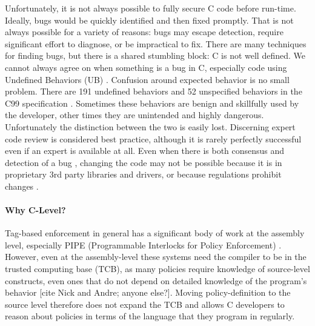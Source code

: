 \documentclass{llncs}
\begin{document}
  Unfortunately, it is not always possible to fully secure C code before run-time.
  Ideally, bugs would be quickly identified and then fixed promptly. 
  That is not always possible for a variety of reasons: bugs may escape detection, 
  require significant effort to diagnose, or be impractical to fix. 
  There are many techniques for finding bugs, but there is a shared stumbling block: C is not 
  well defined. We cannot always agree on when something is a bug in C, especially code using
   Undefined Behaviors (UB) \cite{defactoC}. Confusion around expected behavior is no small problem. 
  There are 191 undefined behaviors and 52 unspecified behaviors in the C99 
  specification \cite{Csmith}. Sometimes these behaviors are benign and skillfully 
  used by the developer, other times they are unintended and highly dangerous. 
  Unfortunately the distinction between the two is easily lost. 
  Discerning expert code review is considered best practice, although it is 
  rarely perfectly successful \cite{} %
  even if an expert is available at all. Even when there is both consensus 
  and detection of a bug , 
  changing the code may not be possible because  
  it is in proprietary 3rd party libraries and drivers, or because
  regulations prohibit changes \cite{Bessey10:Coverity}.

   


\paragraph*{Why C-Level?}
Tag-based enforcement in general has a significant body of work at the assembly level, especially
PIPE (Programmable Interlocks for Policy Enforcement) \cite{}. However, even at the assembly-level
these systems need the compiler to be in the trusted computing base (TCB), as many policies require
knowledge of source-level constructs, even ones that do not depend on detailed knowledge of the program's
behavior [cite Nick and Andre; anyone else?]. Moving policy-definition to the source level therefore
does not expand the TCB and allows C developers to reason about policies in terms of the language that
they program in regularly.
\end{document}
